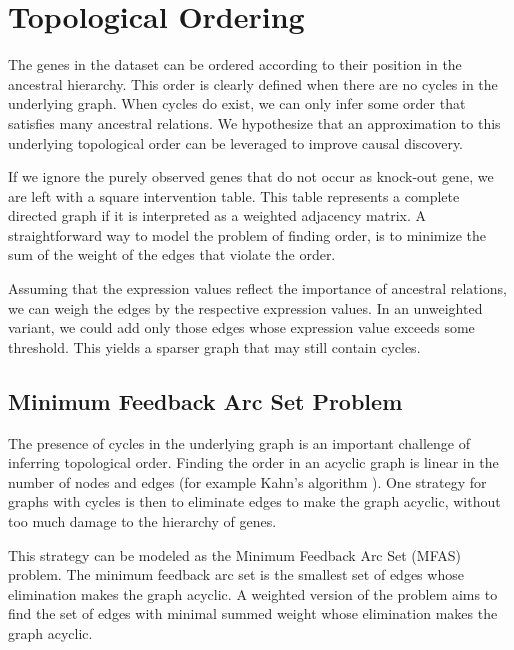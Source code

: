 \newpage
\section{Topological Ordering}



The genes in the dataset can be ordered according to their position in the ancestral hierarchy. This order is clearly defined when there are no cycles in the underlying graph. When cycles do exist, we can only infer some order that satisfies many ancestral relations. We hypothesize that an approximation to this underlying topological order can be leveraged to improve causal discovery.

If we ignore the purely observed genes that do not occur as knock-out gene, we are left with a square intervention table. This table represents a complete directed graph if it is interpreted as a weighted adjacency matrix. A straightforward way to model the problem of finding order, is to minimize the sum of the weight of the edges that violate the order. 

Assuming that the expression values reflect the importance of ancestral relations, we can weigh the edges by the respective expression values. In an unweighted variant, we could add only those edges whose expression value exceeds some threshold. This yields a sparser graph that may still contain cycles.

\subsection{Minimum Feedback Arc Set Problem}
The presence of cycles in the underlying graph is an important challenge of inferring topological order. Finding the order in an acyclic graph is linear in the number of nodes and edges (for example Kahn's algorithm ). One strategy for graphs with cycles is then to eliminate edges to make the graph acyclic, without too much damage to the hierarchy of genes.

This strategy can be modeled as the Minimum Feedback Arc Set (MFAS) problem. The minimum feedback arc set is the smallest set of edges whose elimination makes the graph acyclic. A weighted version of the problem aims to find the set of edges with minimal summed weight whose elimination makes the graph acyclic.

